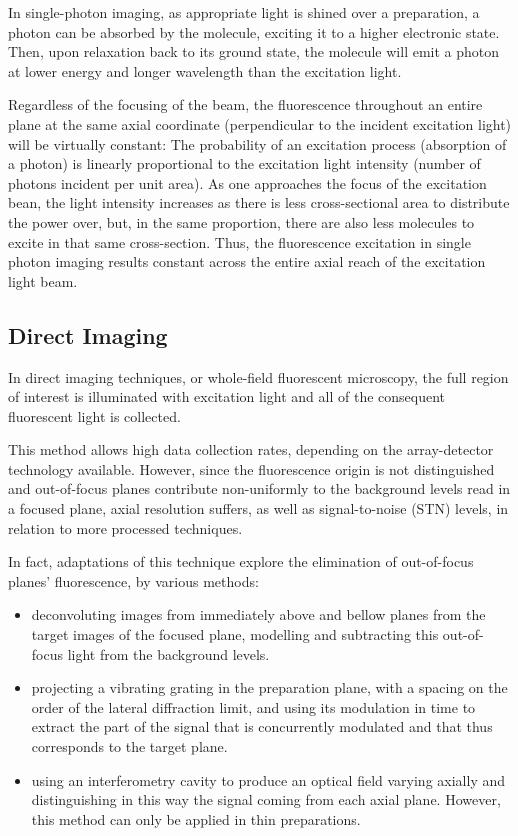 In single-photon imaging, as appropriate light is shined over a preparation, a photon can be absorbed by the molecule, exciting it to a higher electronic state. Then, upon relaxation back to its ground state, the molecule will emit a photon at lower energy and longer wavelength than the excitation light.

Regardless of the focusing of the beam, the fluorescence throughout an entire plane at the same axial coordinate (perpendicular to the incident excitation light) will be virtually constant: The probability of an excitation process (absorption of a photon) is linearly proportional to the excitation light intensity (number of photons incident per unit area). As one approaches the focus of the excitation bean, the light intensity increases as there is less cross-sectional area to distribute the power over, but, in the same proportion, there are also less molecules to excite in that same cross-section. Thus, the fluorescence excitation in single photon imaging results constant across the entire axial reach of the excitation light beam.

\subsection{Direct Imaging}

In direct imaging techniques, or whole-field fluorescent microscopy, the full region of interest is illuminated with excitation light and all of the consequent fluorescent light is collected.

This method allows high data collection rates, depending on the array-detector technology available. However, since the fluorescence origin is not distinguished and out-of-focus planes contribute non-uniformly to the background levels read in a focused plane, axial resolution suffers, as well as signal-to-noise (STN) levels, in relation to more processed techniques.

In fact, adaptations of this technique explore the elimination of out-of-focus planes' fluorescence, by various methods:

\begin{itemize}
\item deconvoluting images from immediately above and bellow planes from the target images of the focused plane, modelling and subtracting this out-of-focus light from the background levels.

\item projecting a vibrating grating in the preparation plane, with a spacing on the order of the lateral diffraction limit, and using its modulation in time to extract the  part of the signal that is concurrently modulated and that thus corresponds to the target plane.

\item using an interferometry cavity to produce an optical field varying axially and distinguishing in this way the signal coming from each axial plane. However, this method can only be applied in thin preparations.
\end{itemize}

